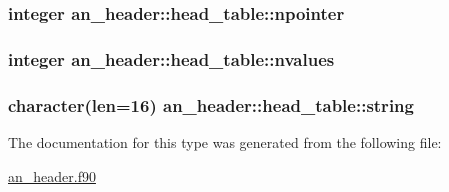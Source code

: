 \subsubsection[{\texorpdfstring{npointer}{npointer}}]{\setlength{\rightskip}{0pt plus 5cm}integer an\+\_\+header\+::head\+\_\+table\+::npointer}\hypertarget{structan__header_1_1head__table_ad73cf9ac7e4131420e4303aa425b183f}{}\label{structan__header_1_1head__table_ad73cf9ac7e4131420e4303aa425b183f}
\subsubsection[{\texorpdfstring{nvalues}{nvalues}}]{\setlength{\rightskip}{0pt plus 5cm}integer an\+\_\+header\+::head\+\_\+table\+::nvalues}\hypertarget{structan__header_1_1head__table_a75d0ca98f45425fdb8df177b5c2458e5}{}\label{structan__header_1_1head__table_a75d0ca98f45425fdb8df177b5c2458e5}
\subsubsection[{\texorpdfstring{string}{string}}]{\setlength{\rightskip}{0pt plus 5cm}character(len=16) an\+\_\+header\+::head\+\_\+table\+::string}\hypertarget{structan__header_1_1head__table_a1be9d5f56131baf037a9da190f74189e}{}\label{structan__header_1_1head__table_a1be9d5f56131baf037a9da190f74189e}


The documentation for this type was generated from the following file\+:\begin{DoxyCompactItemize}
\item 
\hyperlink{an__header_8f90}{an\+\_\+header.\+f90}\end{DoxyCompactItemize}
